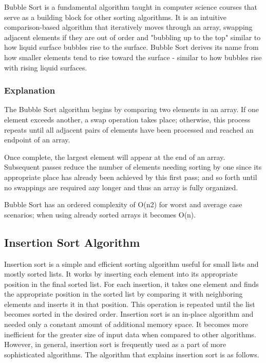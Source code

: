 \documentclass{article}
\begin{document}
Bubble Sort is a fundamental algorithm taught in computer science courses that serve as a building block for other sorting algorithms. It is an intuitive comparison-based algorithm that iteratively moves through an array, swapping adjacent elements if they are out of order and "bubbling up to the top" similar to how liquid surface bubbles rise to the surface. Bubble Sort derives its name from how smaller elements tend to rise toward the surface - similar to how bubbles rise with rising liquid surfaces.


\subsubsection{Explanation}

The Bubble Sort algorithm begins by comparing two elements in an array. If one element exceeds another, a swap operation takes place; otherwise, this process repeats until all adjacent pairs of elements have been processed and reached an endpoint of an array.

Once complete, the largest element will appear at the end of an array. Subsequent passes reduce the number of elements needing sorting by one since its appropriate place has already been achieved by this first pass; and so forth until no swappings are required any longer and thus an array is fully organized.

Bubble Sort has an ordered complexity of O(n2) for worst and average case scenarios; when using already sorted arrays it becomes O(n).

\subsection{Insertion Sort Algorithm}

Insertion sort is a simple and efficient sorting algorithm useful for small lists and
mostly sorted lists. It works by inserting each element into its appropriate position in
the final sorted list. For each insertion, it takes one element and finds the appropriate
position in the sorted list by comparing it with neighboring elements and inserts it in
that position. This operation is repeated until the list becomes sorted in the desired
order. Insertion sort is an in-place algorithm and needed only a constant amount
of additional memory space. It becomes more inefficient for the greater size of
input data when compared to other algorithms. However, in general, insertion sort
is frequently used as a part of more sophisticated algorithms. The algorithm that
explains insertion sort is as follows.\cite{karunanithi2014survey}
\end{document}
